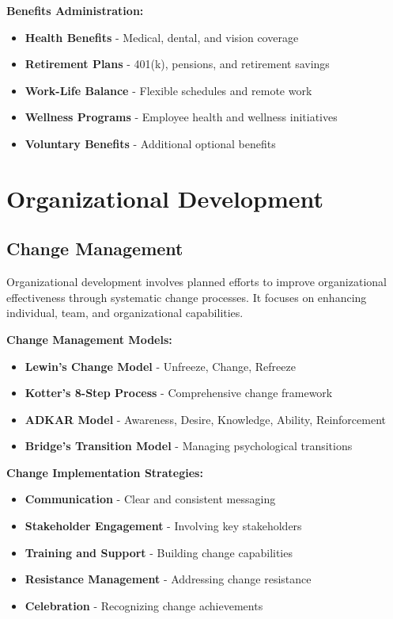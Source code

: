 \documentclass[12pt]{article}
\begin{document}
\textbf{Benefits Administration:}
\begin{itemize}
    \item \textbf{Health Benefits} - Medical, dental, and vision coverage
    \item \textbf{Retirement Plans} - 401(k), pensions, and retirement savings
    \item \textbf{Work-Life Balance} - Flexible schedules and remote work
    \item \textbf{Wellness Programs} - Employee health and wellness initiatives
    \item \textbf{Voluntary Benefits} - Additional optional benefits
\end{itemize}

\section{Organizational Development}

\subsection{Change Management}
Organizational development involves planned efforts to improve organizational effectiveness through systematic change processes. It focuses on enhancing individual, team, and organizational capabilities.

\textbf{Change Management Models:}
\begin{itemize}
    \item \textbf{Lewin's Change Model} - Unfreeze, Change, Refreeze
    \item \textbf{Kotter's 8-Step Process} - Comprehensive change framework
    \item \textbf{ADKAR Model} - Awareness, Desire, Knowledge, Ability, Reinforcement
    \item \textbf{Bridge's Transition Model} - Managing psychological transitions
\end{itemize}

\textbf{Change Implementation Strategies:}
\begin{itemize}
    \item \textbf{Communication} - Clear and consistent messaging
    \item \textbf{Stakeholder Engagement} - Involving key stakeholders
    \item \textbf{Training and Support} - Building change capabilities
    \item \textbf{Resistance Management} - Addressing change resistance
    \item \textbf{Celebration} - Recognizing change achievements
\end{itemize}
\end{document}
